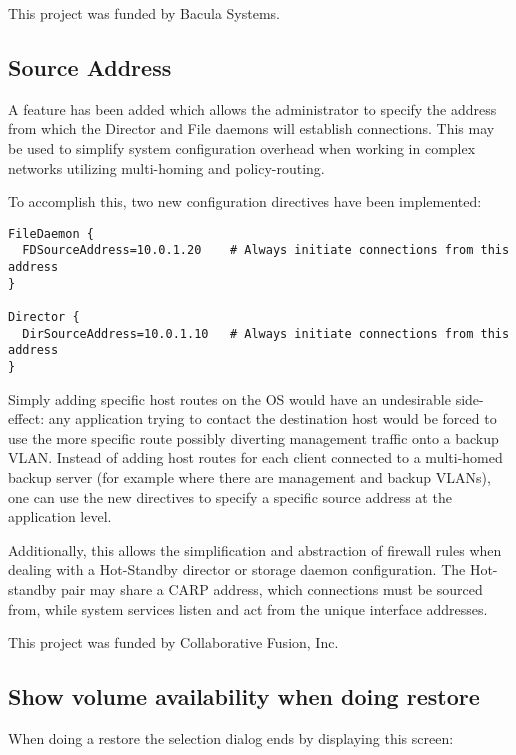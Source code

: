 This project was funded by Bacula Systems.

\subsection{Source Address}

A feature has been added which allows the administrator to specify the address
from which the Director and File daemons will establish connections.  This
may be used to simplify system configuration overhead when working in complex
networks utilizing multi-homing and policy-routing.

To accomplish this, two new configuration directives have been implemented:
\begin{verbatim}
FileDaemon {
  FDSourceAddress=10.0.1.20    # Always initiate connections from this address
}

Director {
  DirSourceAddress=10.0.1.10   # Always initiate connections from this address
}
\end{verbatim}

Simply adding specific host routes on the OS
would have an undesirable side-effect: any
application trying to contact the destination host would be forced to use the
more specific route possibly diverting management traffic onto a backup VLAN.
Instead of adding host routes for each client connected to a multi-homed backup
server (for example where there are management and backup VLANs), one can
use the new directives to specify a specific source address at the application
level.

Additionally, this allows the simplification and abstraction of firewall rules
when dealing with a Hot-Standby director or storage daemon configuration.  The
Hot-standby pair may share a CARP address, which connections must be sourced
from, while system services listen and act from the unique interface addresses.

This project was funded by Collaborative Fusion, Inc.

\subsection{Show volume availability when doing restore}

When doing a restore the selection dialog ends by displaying this
screen:

